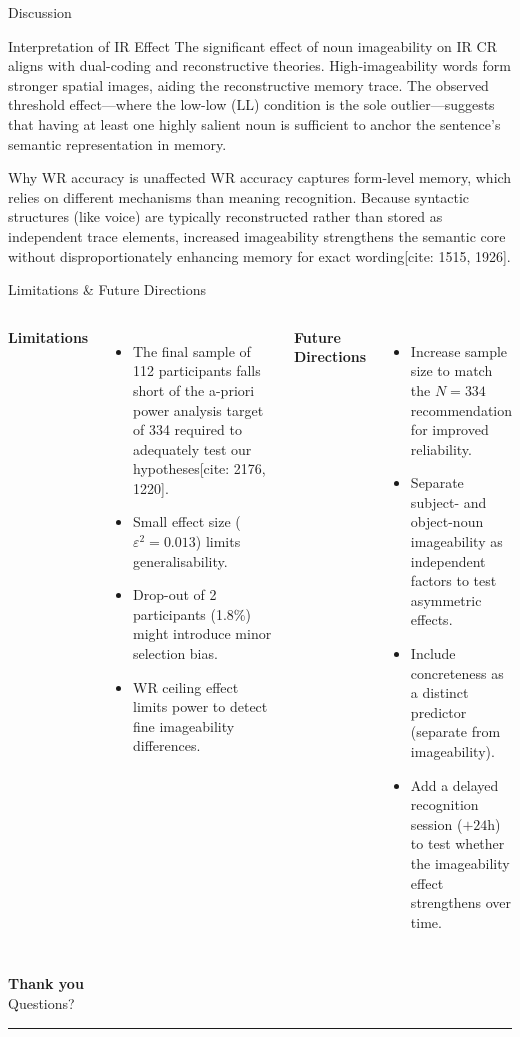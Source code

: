 \documentclass[aspectratio=169, 10pt]{beamer}
\begin{document}
\begin{frame}{Discussion}
  \begin{block}{Interpretation of IR Effect}
    The significant effect of noun imageability on IR CR aligns with dual-coding and reconstructive theories. High-imageability words form stronger spatial images, aiding the reconstructive memory trace. The observed threshold effect—where the low-low (LL) condition is the sole outlier—suggests that having at least one highly salient noun is sufficient to anchor the sentence's semantic representation in memory.
  \end{block}
  \vspace{0.4em}
  \begin{block}{Why WR accuracy is unaffected}
    WR accuracy captures form-level memory, which relies on different mechanisms than meaning recognition. Because syntactic structures (like voice) are typically reconstructed rather than stored as independent trace elements, increased imageability strengthens the semantic core without disproportionately enhancing memory for exact wording[cite: 1515, 1926].
  \end{block}
\end{frame}

\begin{frame}{Limitations \& Future Directions}
  \begin{columns}[T]
      \textbf{Limitations}
      \begin{itemize}
        \item The final sample of 112 participants falls short of the a-priori power analysis target of 334 required to adequately test our hypotheses[cite: 2176, 1220].
        \item Small effect size ($\varepsilon^2 = 0.013$) limits generalisability.
        \item Drop-out of 2 participants (1.8\%) might introduce minor selection bias.
        \item WR ceiling effect limits power to detect fine imageability differences.
      \end{itemize}

      \textbf{Future Directions}
      \begin{itemize}
        \item Increase sample size to match the $N = 334$ recommendation for improved reliability.
        \item Separate subject- and object-noun imageability as independent factors to test asymmetric effects.
        \item Include concreteness as a distinct predictor (separate from imageability).
        \item Add a delayed recognition session ($+24$h) to test whether the imageability effect strengthens over time.
      \end{itemize}
  \end{columns}
\end{frame}

\begin{frame}{}
  \begin{center}
    \vspace{1.5cm}
    {\Huge \textbf{Thank you}}\\[1em]
    {\large Questions?}\\[2em]
    \hrule
  \end{center}
\end{frame}
\end{document}
